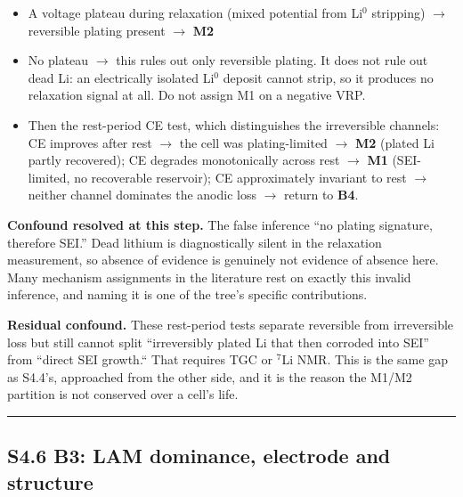 \documentclass[11pt,a4paper]{article}
\begin{document}
\begin{itemize}
  \item A voltage plateau during relaxation (mixed potential from Li\ensuremath{^{0}} stripping) \ensuremath{\rightarrow} reversible plating present \ensuremath{\rightarrow} \textbf{M2}
  \item No plateau \ensuremath{\rightarrow} this rules out only reversible plating. It does not rule out dead Li: an electrically isolated Li\ensuremath{^{0}} deposit cannot strip, so it produces no relaxation signal at all. Do not assign M1 on a negative VRP.
  \item Then the rest-period CE test, which distinguishes the irreversible channels: CE improves after rest \ensuremath{\rightarrow} the cell was plating-limited \ensuremath{\rightarrow} \textbf{M2} (plated Li partly recovered); CE degrades monotonically across rest \ensuremath{\rightarrow} \textbf{M1} (SEI-limited, no recoverable reservoir); CE approximately invariant to rest \ensuremath{\rightarrow} neither channel dominates the anodic loss \ensuremath{\rightarrow} return to \textbf{B4}.
\end{itemize}


\textbf{Confound resolved at this step.} The false inference \textquotedblleft{}no plating signature, therefore SEI.\textquotedblright{} Dead lithium is diagnostically silent in the relaxation measurement, so absence of evidence is genuinely not evidence of absence here. Many mechanism assignments in the literature rest on exactly this invalid inference, and naming it is one of the tree's specific contributions.


\textbf{Residual confound.} These rest-period tests separate reversible from irreversible loss but still cannot split \textquotedblleft{}irreversibly plated Li that then corroded into SEI\textquotedblright{} from \textquotedblleft{}direct SEI growth.\textquotedblleft{} That requires TGC or \ensuremath{^{7}}Li NMR. This is the same gap as S4.4's, approached from the other side, and it is the reason the M1/M2 partition is not conserved over a cell's life.


\par\noindent\rule{\linewidth}{0.4pt}\par


\subsection*{S4.6 B3: LAM dominance, electrode and structure}
\end{document}
